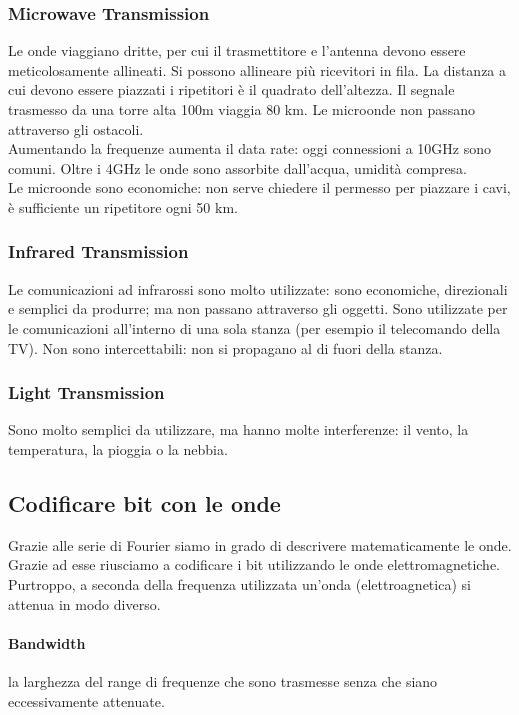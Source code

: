 \documentclass{article}
\begin{document}
\subsubsection{Microwave Transmission}
Le onde viaggiano dritte, per cui il trasmettitore e l'antenna devono essere
meticolosamente allineati. Si possono allineare più ricevitori in fila. La
distanza a cui devono essere piazzati i ripetitori è il quadrato dell'altezza.
Il segnale trasmesso da una torre alta 100m viaggia 80 km. Le microonde non
passano attraverso gli ostacoli.\\
Aumentando la frequenze aumenta il data rate: oggi connessioni a 10GHz sono
comuni. Oltre i 4GHz le onde sono assorbite dall'acqua, umidità compresa.\\
Le microonde sono economiche: non serve chiedere il permesso per piazzare i
cavi, è sufficiente un ripetitore ogni 50 km.

\subsubsection{Infrared Transmission}
Le comunicazioni ad infrarossi sono molto utilizzate: sono economiche,
direzionali e semplici da produrre; ma non passano attraverso gli oggetti. Sono
utilizzate per le comunicazioni all'interno di una sola stanza (per esempio il
telecomando della TV). Non sono intercettabili: non si propagano al di fuori
della stanza.

\subsubsection{Light Transmission}
Sono molto semplici da utilizzare, ma hanno molte interferenze: il vento, la
temperatura, la pioggia o la nebbia.

\subsection{Codificare bit con le onde}
Grazie alle serie di Fourier siamo in grado di descrivere matematicamente le
onde. Grazie ad esse riusciamo a codificare i bit utilizzando le onde
elettromagnetiche. Purtroppo, a seconda della frequenza utilizzata un'onda
(elettroagnetica) si attenua in modo diverso.

\paragraph{Bandwidth} la larghezza del range di frequenze che sono trasmesse
senza che siano eccessivamente attenuate.
\end{document}
